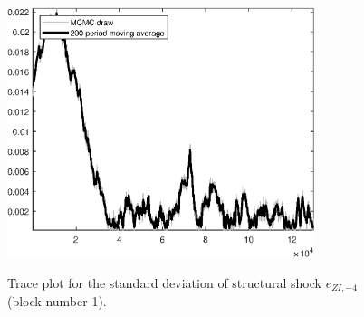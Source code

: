 \begin{figure}[H]
\centering
  \includegraphics[width=0.8\textwidth]{BRS_sectoral_wo_fixed_cost/graphs/TracePlot_SE_e_ZI_news_blck_1}\\
    \caption{Trace plot for the standard deviation of structural shock ${e_{ZI,-4}}$ (block number 1).}
\end{figure}
